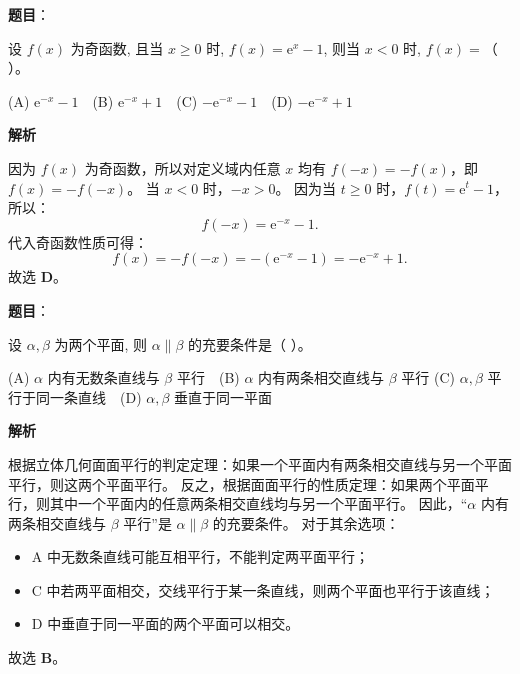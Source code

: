 \begin{answer}

\textbf{题目}：

设 $f(x)$ 为奇函数, 且当 $x \geqslant 0$ 时, $f(x) = \mathrm{e}^x - 1$, 则当 $x < 0$ 时, $f(x) =$（ ）。

(A) $\mathrm{e}^{-x} - 1$　(B) $\mathrm{e}^{-x} + 1$　(C) $-\mathrm{e}^{-x} - 1$　(D) $-\mathrm{e}^{-x} + 1$

\textbf{解析}

因为 $f(x)$ 为奇函数，所以对定义域内任意 $x$ 均有 $f(-x) = -f(x)$，即 $f(x) = -f(-x)$。
当 $x < 0$ 时，$-x > 0$。
因为当 $t \geqslant 0$ 时，$f(t) = \mathrm{e}^t - 1$，所以：
\nopagebreak[4]
\[f(-x) = \mathrm{e}^{-x} - 1.\]
代入奇函数性质可得：
\nopagebreak[4]
\[f(x) = -f(-x) = -(\mathrm{e}^{-x} - 1) = -\mathrm{e}^{-x} + 1.\]
故选 \textbf{D}。


\end{answer}
\begin{answer}

\textbf{题目}：

设 $\alpha, \beta$ 为两个平面, 则 $\alpha \parallel \beta$ 的充要条件是（ ）。

(A) $\alpha$ 内有无数条直线与 $\beta$ 平行　(B) $\alpha$ 内有两条相交直线与 $\beta$ 平行
(C) $\alpha, \beta$ 平行于同一条直线　(D) $\alpha, \beta$ 垂直于同一平面

\textbf{解析}

根据立体几何面面平行的判定定理：如果一个平面内有两条相交直线与另一个平面平行，则这两个平面平行。
反之，根据面面平行的性质定理：如果两个平面平行，则其中一个平面内的任意两条相交直线均与另一个平面平行。
因此，“$\alpha$ 内有两条相交直线与 $\beta$ 平行”是 $\alpha \parallel \beta$ 的充要条件。
对于其余选项：
\begin{itemize}
\item A 中无数条直线可能互相平行，不能判定两平面平行；
\item C 中若两平面相交，交线平行于某一条直线，则两个平面也平行于该直线；
\item D 中垂直于同一平面的两个平面可以相交。
\end{itemize}
故选 \textbf{B}。


\end{answer}
